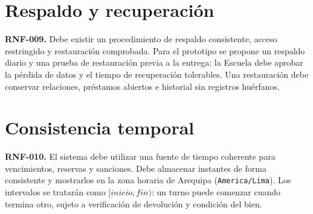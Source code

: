 \section{Respaldo y recuperaci\'on}
\textbf{RNF-009.} Debe existir un procedimiento de respaldo consistente, acceso restringido y restauraci\'on comprobada. Para el prototipo se propone un respaldo diario y una prueba de restauraci\'on previa a la entrega; la Escuela debe aprobar la p\'erdida de datos y el tiempo de recuperaci\'on tolerables. Una restauraci\'on debe conservar relaciones, pr\'estamos abiertos e historial sin registros hu\'erfanos.

\section{Consistencia temporal}
\textbf{RNF-010.} El sistema debe utilizar una fuente de tiempo coherente para vencimientos, reservas y sanciones. Debe almacenar instantes de forma consistente y mostrarlos en la zona horaria de Arequipa (\texttt{America/Lima}). Los intervalos se tratar\'an como $[inicio,fin)$: un turno puede comenzar cuando termina otro, sujeto a verificaci\'on de devoluci\'on y condici\'on del bien.

